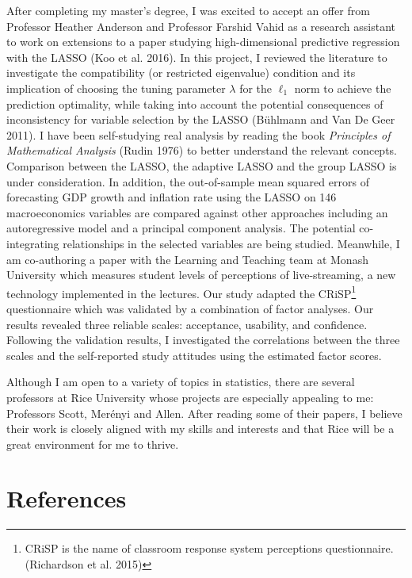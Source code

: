 \documentclass[12pt,]{article}
\let\rmarkdownfootnote\footnote%
\def\footnote{\protect\rmarkdownfootnote}
\begin{document}
After completing my master's degree, I was excited to accept an offer
from Professor Heather Anderson and Professor Farshid Vahid as a
research assistant to work on extensions to a paper studying
high-dimensional predictive regression with the LASSO (Koo et al. 2016).
In this project, I reviewed the literature to investigate the
compatibility (or restricted eigenvalue) condition and its implication
of choosing the tuning parameter \(\lambda\) for the \(\ell_1\) norm to
achieve the prediction optimality, while taking into account the
potential consequences of inconsistency for variable selection by the
LASSO (Bühlmann and Van De Geer 2011). I have been self-studying real
analysis by reading the book \emph{Principles of Mathematical Analysis}
(Rudin 1976) to better understand the relevant concepts. Comparison
between the LASSO, the adaptive LASSO and the group LASSO is under
consideration. In addition, the out-of-sample mean squared errors of
forecasting GDP growth and inflation rate using the LASSO on 146
macroeconomics variables are compared against other approaches including
an autoregressive model and a principal component analysis. The
potential co-integrating relationships in the selected variables are
being studied. Meanwhile, I am co-authoring a paper with the Learning
and Teaching team at Monash University which measures student levels of
perceptions of live-streaming, a new technology implemented in the
lectures. Our study adapted the CRiSP\footnote{CRiSP is the name of
  classroom response system perceptions questionnaire. (Richardson et
  al. 2015)} questionnaire which was validated by a combination of
factor analyses. Our results revealed three reliable scales: acceptance,
usability, and confidence. Following the validation results, I
investigated the correlations between the three scales and the
self-reported study attitudes using the estimated factor scores.

Although I am open to a variety of topics in statistics, there are
several professors at Rice University whose projects are especially
appealing to me: Professors Scott, Merényi and Allen. After reading some
of their papers, I believe their work is closely aligned with my skills
and interests and that Rice will be a great environment for me to
thrive.

\section*{References}\label{references}
\end{document}
